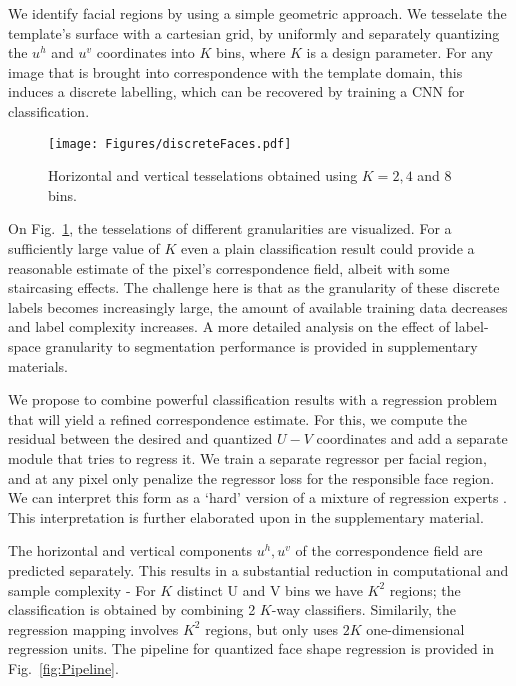 \documentclass[10pt,twocolumn,letterpaper]{article}
\begin{document}
	We identify  facial regions  by using a simple geometric approach.
	We tesselate the template's surface with a cartesian grid, by uniformly and separately quantizing the $u^h$ and $u^v$ coordinates into $K$ bins, where $K$ is a design parameter. For any image that is brought into correspondence with the template domain, this induces a discrete labelling, which can be recovered by training a  CNN for classification.
	
\begin{figure}[b]
\begin{center}
   \texttt{[image: Figures/discreteFaces.pdf]}
\end{center}
   \caption{Horizontal and vertical tesselations obtained using $K=2,4$ and $8$ bins.}
   \vspace{-0.5cm}
\label{fig:DiscreteFaces}
\end{figure}

	 On Fig.~\ref{fig:DiscreteFaces}, the tesselations of different granularities are visualized. For a sufficiently large value of $K$ even a plain classification result could provide a reasonable estimate of the pixel's correspondence field, albeit with some staircasing effects. The challenge here is that as the granularity of these discrete labels becomes increasingly large, the amount of available training data decreases and label complexity increases. A more detailed analysis on the effect of label-space granularity to segmentation performance is provided in supplementary materials.
	
	We propose to combine powerful classification results with a regression problem that will yield a  refined  correspondence estimate. For this, we compute the residual between the desired and quantized $U-V$  coordinates and add a separate module that tries to regress it. We train a separate regressor per facial region, and at any pixel only penalize the regressor loss for the responsible face region. We can interpret this form as a `hard' version of a mixture of regression experts \cite{JordanJ94}. This interpretation is further elaborated upon in the supplementary material.
	
		The horizontal and vertical components $u^h,u^v$ of the correspondence field are predicted separately. This results in a substantial reduction in computational and sample complexity -  For $K$ distinct U and V bins we have $K^2$ regions; the classification is obtained by combining 2 $K$-way classifiers. Similarily, the regression mapping involves $K^2$ regions, but only uses $2 K$ one-dimensional regression units. The pipeline for quantized face shape regression is provided in Fig.~\ref{fig:Pipeline}. 
\end{document}
